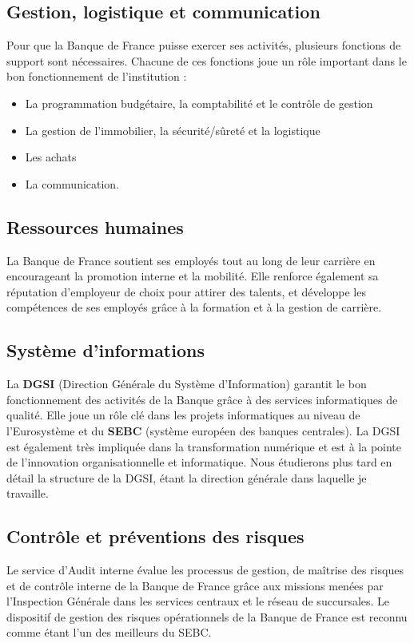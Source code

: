 \documentclass{report}
\begin{document}
\subsection{Gestion, logistique et communication}
Pour que la Banque de France puisse exercer ses activités, plusieurs fonctions de support sont nécessaires. Chacune de ces fonctions joue un rôle important dans le bon fonctionnement de l'institution :
\begin{itemize}
    \item La programmation budgétaire, la comptabilité et le contrôle de gestion
    \item La gestion de l'immobilier, la sécurité/sûreté et la logistique
    \item Les achats
    \item La communication.
\end{itemize}

\subsection{Ressources humaines}
La Banque de France soutient ses employés tout au long de leur carrière en encourageant la promotion interne et la mobilité. Elle renforce également sa réputation d'employeur de choix pour attirer des talents, et développe les compétences de ses employés grâce à la formation et à la gestion de carrière.

\subsection{Système d'informations}
La  \textbf{DGSI} (Direction Générale du Système d'Information) garantit le bon fonctionnement des activités de la Banque grâce à des services informatiques de qualité.
Elle joue un rôle clé dans les projets informatiques au niveau de l'Eurosystème et du \textbf{SEBC} (système européen des banques centrales).
La DGSI est également très impliquée dans la transformation numérique et est à la pointe de l'innovation organisationnelle et informatique.
Nous étudierons plus tard en détail la structure de la DGSI, étant la direction générale dans laquelle je travaille.

\subsection{Contrôle et préventions des risques}
Le service d'Audit interne évalue les processus de gestion, de maîtrise des risques et de contrôle interne de la Banque de France grâce aux missions menées par l'Inspection Générale dans les services centraux et le réseau de succursales. Le dispositif de gestion des risques opérationnels de la Banque de France est reconnu comme étant l'un des meilleurs du SEBC.
\end{document}
